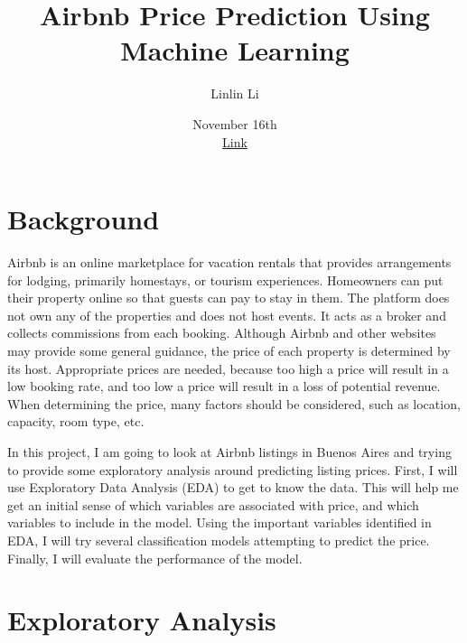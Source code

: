 \documentclass[11pt]{article}
\title{Airbnb Price Prediction Using Machine Learning}
\author{Linlin Li}
\date{November 16th\\ \href{https://www.kaggle.com/c/duke-cs671-fall20-airbnb-pricing-data}{Link}}
\begin{document}
\maketitle

\section{Background}
Airbnb is an online marketplace for vacation rentals that provides arrangements for lodging, primarily homestays, or tourism experiences. Homeowners can put their property online so that guests can pay to stay in them. The platform does not own any of the properties and does not host events. It acts as a broker and collects commissions from each booking. Although Airbnb and other websites may provide some general guidance, the price of each property is determined by its host. Appropriate prices are needed, because too high a price will result in a low booking rate, and too low a price will result in a loss of potential revenue. When determining the price, many factors should be considered, such as location, capacity, room type, etc. 

In this project, I am going to look at Airbnb listings in Buenos Aires and trying to provide some exploratory analysis around predicting listing prices. First, I will use Exploratory Data Analysis (EDA) to get to know the data. This will help me get an initial sense of which variables are associated with price, and which variables to include in the model. Using the important variables identified in EDA, I will try several classification models attempting to predict the price. Finally, I will evaluate the performance of the model.

\section{Exploratory Analysis}
\end{document}
